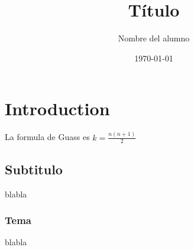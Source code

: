 \documentclass{article} %
\title{Título}
\author{Nombre del alumno}
\date{\today} %
\begin{document}

\maketitle

\section{Introduction}

La formula de Guass es $k=\frac{n(n+1)}{2}$

\subsection{Subtitulo}
blabla

\subsubsection{Tema}
blabla
\end{document}
